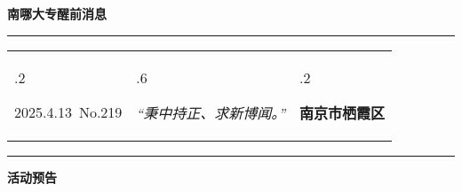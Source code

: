 \documentclass[letterpaper, 12pt]{article}
\begin{document}
\begin{center}
    \Huge\textbf{南哪大专醒前消息}
\end{center}
\vspace{4mm}
\hrule
\renewcommand\tabularxcolumn[1]{m{#1}}
\begin{tabularx}{\textwidth}{>{\hsize.2\hsize}X>{\hsize.6\hsize}X>{\hsize.2\hsize}X}
    \begin{flushleft}
        2025.4.13\, No.219
    \end{flushleft}
    &
    \begin{center}
        \textit{“秉中持正、求新博闻。”}
    \end{center}
    &
    \begin{flushright}
        \textbf{南京市栖霞区}
    \end{flushright}
\end{tabularx}
\vspace{-3.5mm}
\hrule
\vspace{4mm}
\centerline{\huge\textbf{活动预告}}
\end{document}

